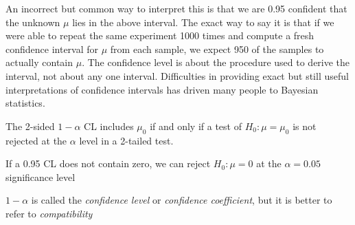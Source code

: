 An incorrect but common way to interpret this is that we are 0.95
confident that the 
unknown $\mu$ lies in the above interval.  The exact way to say it is
that if we were able to repeat the same experiment 1000 times and
compute a fresh confidence interval for $\mu$ from each sample, we
expect 950 of the samples to actually contain $\mu$.  The confidence
level is about the procedure used to derive the interval, not about
any one interval.  Difficulties in
providing exact but still useful interpretations of confidence intervals has driven
many people to Bayesian statistics.

The 2-sided $1-\alpha$ CL includes $\mu_{0}$ if and only if a test of $H_{0}:
\mu=\mu_{0}$ is not rejected at the $\alpha$ level in a 2-tailed test.
\bi
\item If a 0.95 CL does not contain zero, we can reject $H_0: \mu = 0$ at the $\alpha = 0.05$ significance level
\ei

$1 - \alpha$ is called the \emph{confidence level} or \emph{confidence
  coefficient}, but it is better to refer to \emph{compatibility}

